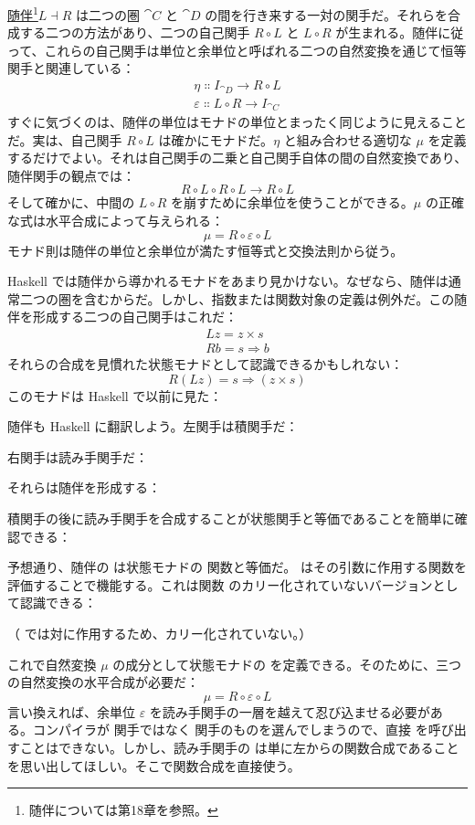 \hyperref[adjunctions]{随伴}\footnote{随伴については第18章を参照。}$L \dashv R$ は二つの圏 $\cat{C}$ と $\cat{D}$ の間を行き来する一対の関手だ。それらを合成する二つの方法があり、二つの自己関手 $R \circ L$ と $L \circ R$ が生まれる。随伴に従って、これらの自己関手は単位と余単位と呼ばれる二つの自然変換を通じて恒等関手と関連している：
\begin{gather*}
  \eta \Colon I_{\cat{D}} \to R \circ L \\
  \varepsilon \Colon L \circ R \to I_{\cat{C}}
\end{gather*}
すぐに気づくのは、随伴の単位はモナドの単位とまったく同じように見えることだ。実は、自己関手 $R \circ L$ は確かにモナドだ。$\eta$ と組み合わせる適切な $\mu$ を定義するだけでよい。それは自己関手の二乗と自己関手自体の間の自然変換であり、随伴関手の観点では：
\[R \circ L \circ R \circ L \to R \circ L\]
そして確かに、中間の $L \circ R$ を崩すために余単位を使うことができる。$\mu$ の正確な式は水平合成によって与えられる：
\[\mu = R \circ \varepsilon \circ L\]
モナド則は随伴の単位と余単位が満たす恒等式と交換法則から従う。

Haskell では随伴から導かれるモナドをあまり見かけない。なぜなら、随伴は通常二つの圏を含むからだ。しかし、指数または関数対象の定義は例外だ。この随伴を形成する二つの自己関手はこれだ：
\begin{gather*}
  L z = z\times{}s \\
  R b = s \Rightarrow b
\end{gather*}
それらの合成を見慣れた状態モナドとして認識できるかもしれない：
\[R (L z) = s \Rightarrow (z\times{}s)\]
このモナドは Haskell で以前に見た：

随伴も Haskell に翻訳しよう。左関手は積関手だ：

右関手は読み手関手だ：

それらは随伴を形成する：

積関手の後に読み手関手を合成することが状態関手と等価であることを簡単に確認できる：

予想通り、随伴の  は状態モナドの  関数と等価だ。 はその引数に作用する関数を評価することで機能する。これは関数  のカリー化されていないバージョンとして認識できる：

（ では対に作用するため、カリー化されていない。）

これで自然変換 $\mu$ の成分として状態モナドの  を定義できる。そのために、三つの自然変換の水平合成が必要だ：
\[\mu = R \circ \varepsilon \circ L\]
言い換えれば、余単位 $\varepsilon$ を読み手関手の一層を越えて忍び込ませる必要がある。コンパイラが  関手ではなく  関手のものを選んでしまうので、直接  を呼び出すことはできない。しかし、読み手関手の  は単に左からの関数合成であることを思い出してほしい。そこで関数合成を直接使う。


